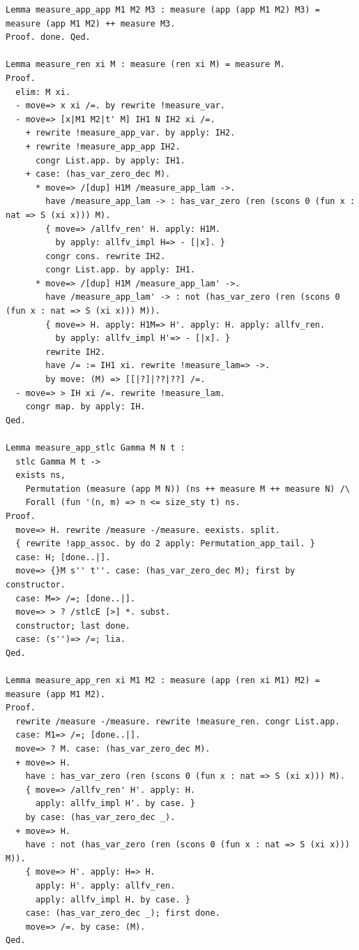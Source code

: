 \begin{lstlisting}[style=authorcoq]
Lemma measure_app_app M1 M2 M3 : measure (app (app M1 M2) M3) = measure (app M1 M2) ++ measure M3.
Proof. done. Qed.

Lemma measure_ren xi M : measure (ren xi M) = measure M.
Proof.
  elim: M xi.
  - move=> x xi /=. by rewrite !measure_var.
  - move=> [x|M1 M2|t' M] IH1 N IH2 xi /=.
    + rewrite !measure_app_var. by apply: IH2.
    + rewrite !measure_app_app IH2.
      congr List.app. by apply: IH1.
    + case: (has_var_zero_dec M).
      * move=> /[dup] H1M /measure_app_lam ->.
        have /measure_app_lam -> : has_var_zero (ren (scons 0 (fun x : nat => S (xi x))) M).
        { move=> /allfv_ren' H. apply: H1M.
          by apply: allfv_impl H=> - [|x]. }
        congr cons. rewrite IH2.
        congr List.app. by apply: IH1.
      * move=> /[dup] H1M /measure_app_lam' ->.
        have /measure_app_lam' -> : not (has_var_zero (ren (scons 0 (fun x : nat => S (xi x))) M)).
        { move=> H. apply: H1M=> H'. apply: H. apply: allfv_ren.
          by apply: allfv_impl H'=> - [|x]. }
        rewrite IH2.
        have /= := IH1 xi. rewrite !measure_lam=> ->.
        by move: (M) => [[|?]|??|??] /=.
  - move=> > IH xi /=. rewrite !measure_lam.
    congr map. by apply: IH.
Qed.

Lemma measure_app_stlc Gamma M N t :
  stlc Gamma M t ->
  exists ns,
    Permutation (measure (app M N)) (ns ++ measure M ++ measure N) /\
    Forall (fun '(n, m) => n <= size_sty t) ns.
Proof.
  move=> H. rewrite /measure -/measure. eexists. split.
  { rewrite !app_assoc. by do 2 apply: Permutation_app_tail. }
  case: H; [done..|].
  move=> {}M s'' t''. case: (has_var_zero_dec M); first by constructor.
  case: M=> /=; [done..|].
  move=> > ? /stlcE [>] *. subst.
  constructor; last done.
  case: (s'')=> /=; lia.
Qed.

Lemma measure_app_ren xi M1 M2 : measure (app (ren xi M1) M2) = measure (app M1 M2).
Proof.
  rewrite /measure -/measure. rewrite !measure_ren. congr List.app.
  case: M1=> /=; [done..|].
  move=> ? M. case: (has_var_zero_dec M).
  + move=> H.
    have : has_var_zero (ren (scons 0 (fun x : nat => S (xi x))) M).
    { move=> /allfv_ren' H'. apply: H.
      apply: allfv_impl H'. by case. }
    by case: (has_var_zero_dec _).
  + move=> H.
    have : not (has_var_zero (ren (scons 0 (fun x : nat => S (xi x))) M)).
    { move=> H'. apply: H=> H.
      apply: H'. apply: allfv_ren.
      apply: allfv_impl H. by case. }
    case: (has_var_zero_dec _); first done.
    move=> /=. by case: (M).
Qed.


\end{lstlisting}
